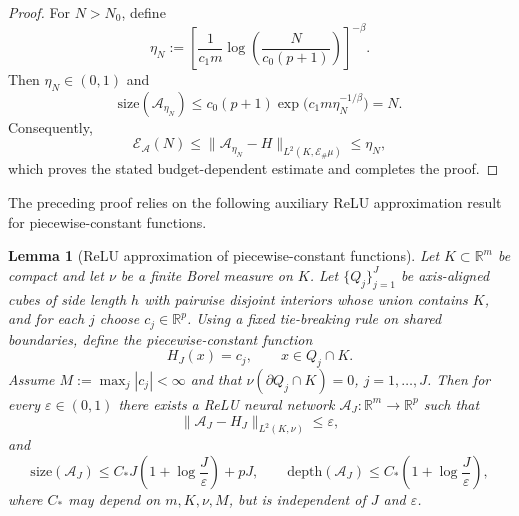 \documentclass{article}
\numberwithin{equation}{section}
\theoremstyle{plain}
\newtheorem{lemma}{Lemma}[section]
\begin{document}
\begin{proof}
		For $N> N_0$, define
		\begin{equation*}
			\eta_N
			:=
			\left[
			\frac{1}{c_1m}
			\log\!\left(\frac{N}{c_0(p+1)}\right)
			\right]^{-\beta}.
		\end{equation*}
		Then $\eta_N\in(0,1)$ and
		\begin{equation*}
			\mathrm{size}(\mathcal A_{\eta_N})
			\le
			c_0(p+1)\exp \bigl(c_1m\eta_N^{-1/\beta}\bigr)
			=N.
		\end{equation*}
		Consequently,
		\begin{equation*}
			\mathscr E_{\mathcal A}(N)
			\le
			\|\mathcal A_{\eta_N}-H\|_{L^2(K,\mathcal E_\#\mu)}
			\le \eta_N,
		\end{equation*}
		which proves the stated budget-dependent estimate and completes the proof.
	\end{proof}
	
	The preceding proof relies on the following auxiliary ReLU approximation result for piecewise-constant functions.
	\begin{lemma}[ReLU approximation of piecewise-constant functions]
		\label{lem:PC-J}
		Let $K\subset\mathbb{R}^m$ be compact and let $\nu$ be a finite Borel measure on $K$.
		Let $\{Q_j\}_{j=1}^{J}$ be axis-aligned cubes of side length $h$ with pairwise disjoint interiors whose union contains $K$, and for each $j$ choose $c_j\in\mathbb{R}^p$.
		Using a fixed tie-breaking rule on shared boundaries, define the piecewise-constant function
		\begin{equation*}
			H_J(x)=c_j,\qquad x\in Q_j\cap K .
		\end{equation*}
		Assume $M:=\max_j |c_j|<\infty$ and that
		$\nu(\partial Q_j\cap K)=0$, $j=1,\dots,J$.
		Then for every $\varepsilon\in(0,1)$ there exists a ReLU neural network $\mathcal A_J:\mathbb{R}^m\to\mathbb{R}^p$ such that
		\begin{equation*}
			\|\mathcal A_J-H_J\|_{L^2(K,\nu)}\le \varepsilon,
		\end{equation*}
		and
		\begin{equation*}
			\mathrm{size}(\mathcal A_J)
			\le C_*J\left(1+\log\frac{J}{\varepsilon}\right)+pJ,
			\qquad
			\mathrm{depth}(\mathcal A_J)
			\le C_*\left(1+\log\frac{J}{\varepsilon}\right),
		\end{equation*}
		where $C_*$ may depend on $m,K,\nu,M$, but is independent of $J$ and $\varepsilon$.
	\end{lemma}
	
\end{document}
